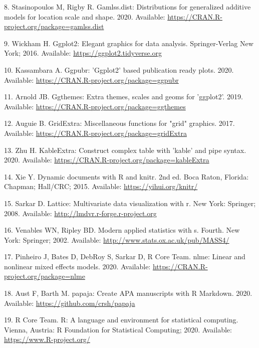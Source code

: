 \documentclass[10pt,letterpaper]{article}
\begin{document}
\leavevmode\hypertarget{ref-R-gamlss.dist}{}%
8. Stasinopoulos M, Rigby R. Gamlss.dist: Distributions for generalized additive models for location scale and shape. 2020. Available: \url{https://CRAN.R-project.org/package=gamlss.dist}

\leavevmode\hypertarget{ref-R-ggplot2}{}%
9. Wickham H. Ggplot2: Elegant graphics for data analysis. Springer-Verlag New York; 2016. Available: \url{https://ggplot2.tidyverse.org}

\leavevmode\hypertarget{ref-R-ggpubr}{}%
10. Kassambara A. Ggpubr: 'Ggplot2' based publication ready plots. 2020. Available: \url{https://CRAN.R-project.org/package=ggpubr}

\leavevmode\hypertarget{ref-R-ggthemes}{}%
11. Arnold JB. Ggthemes: Extra themes, scales and geoms for 'ggplot2'. 2019. Available: \url{https://CRAN.R-project.org/package=ggthemes}

\leavevmode\hypertarget{ref-R-gridExtra}{}%
12. Auguie B. GridExtra: Miscellaneous functions for "grid" graphics. 2017. Available: \url{https://CRAN.R-project.org/package=gridExtra}

\leavevmode\hypertarget{ref-R-kableExtra}{}%
13. Zhu H. KableExtra: Construct complex table with 'kable' and pipe syntax. 2020. Available: \url{https://CRAN.R-project.org/package=kableExtra}

\leavevmode\hypertarget{ref-R-knitr}{}%
14. Xie Y. Dynamic documents with R and knitr. 2nd ed. Boca Raton, Florida: Chapman; Hall/CRC; 2015. Available: \url{https://yihui.org/knitr/}

\leavevmode\hypertarget{ref-R-lattice}{}%
15. Sarkar D. Lattice: Multivariate data visualization with r. New York: Springer; 2008. Available: \url{http://lmdvr.r-forge.r-project.org}

\leavevmode\hypertarget{ref-R-MASS}{}%
16. Venables WN, Ripley BD. Modern applied statistics with s. Fourth. New York: Springer; 2002. Available: \url{http://www.stats.ox.ac.uk/pub/MASS4/}

\leavevmode\hypertarget{ref-R-nlme}{}%
17. Pinheiro J, Bates D, DebRoy S, Sarkar D, R Core Team. nlme: Linear and nonlinear mixed effects models. 2020. Available: \url{https://CRAN.R-project.org/package=nlme}

\leavevmode\hypertarget{ref-R-papaja}{}%
18. Aust F, Barth M. papaja: Create APA manuscripts with R Markdown. 2020. Available: \url{https://github.com/crsh/papaja}

\leavevmode\hypertarget{ref-R-parallel}{}%
19. R Core Team. R: A language and environment for statistical computing. Vienna, Austria: R Foundation for Statistical Computing; 2020. Available: \url{https://www.R-project.org/}
\end{document}
